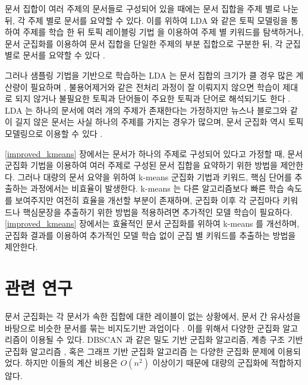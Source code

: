\documentclass[oneside, ko,phd]{snuthesis_utf8_kor}
\begin{document}
문서 집합이 여러 주제의 문서들로 구성되어 있을 때에는 문서 집합을 주제 별로 나눈 뒤, 각 주제 별로 문서를 요약할 수 있다.
이를 위하여 LDA \cite{blei2003latent} 와 같은 토픽 모델링을 통하여 주제를 학습 한 뒤 토픽 레이블링 기법 \cite{sievert2014ldavis} 을 이용하여 주제 별 키워드를 탐색하거나, 문서 군집화를 이용하여 문서 집합을 단일한 주제의 부분 집합으로 구분한 뒤, 각 군집별로 문서를 요약할 수 있다 \cite{wan2008multi, erkan2004lexpagerank, twinandilla2018multi}.

그러나 샘플링 기법을 기반으로 학습하는 LDA 는 문서 집합의 크기가 클 경우 많은 계산량이 필요하며 \cite{yuan2015lightlda}, 불용어제거와 같은 전처리 과정이 잘 이뤄지지 않으면 학습이 제대로 되지 않거나 불필요한 토픽과 단어들이 주요한 토픽과 단어로 해석되기도 한다 \cite{darling2011theoretical, newman2010evaluating}.
LDA 는 하나의 문서에 여러 개의 주제가 존재한다는 가정하지만 뉴스나 블로그와 같이 길지 않은 문서는 사실 하나의 주제를 가지는 경우가 많으며, 문서 군집화 역시 토픽 모델링으로 이용할 수 있다 \cite{dhillon2001concept, xu2003document, xie2013integrating}.

\ref{improved_kmeans} 장에서는 문서가 하나의 주제로 구성되어 있다고 가정할 때, 문서 군집화 기법을 이용하여 여러 주제로 구성된 문서 집합을 요약하기 위한 방법을 제안한다.
그러나 대량의 문서 요약을 위하여 k-means 군집화 기법과 키워드, 핵심 단어를 추출하는 과정에서는 비효율이 발생한다.
k-means 는 다른 알고리즘보다 빠른 학습 속도를 보여주지만 여전히 효율을 개선할 부분이 존재하며, 군집화 이후 각 군집마다 키워드나 핵심문장을 추출하기 위한 방법을 적용하려면 추가적인 모델 학습이 필요하다.
\ref{improved_kmeans} 장에서는 효율적인 문서 군집화를 위하여 k-means 를 개선하며, 군집화 결과를 이용하여 추가적인 모델 학습 없이 군집 별 키워드를 추출하는 방법을 제안한다.

\section{관련 연구}

문서 군집화는 각 문서가 속한 집합에 대한 레이블이 없는 상황에서, 문서 간 유사성을 바탕으로 비슷한 문서를 묶는 비지도기반 과업이다 \cite{xu2015comprehensive, yang2017towards, xie2016unsupervised}.
이를 위해서 다양한 군집화 알고리즘이 이용될 수 있다.
DBSCAN \cite{ester1996density}과 같은 밀도 기반 군집화 알고리즘, 계층 구조 기반 군집화 알고리즘 \cite{sibson1973slink}, 혹은 그래프 기반 군집화 알고리즘 \cite{clauset2004finding} 는 다양한 군집화 문제에 이용되었다.
하지만 이들의 계산 비용은 $O(n^2)$ 이상이기 때문에 대량의 군집화에 적합하지 않다.
\end{document}
